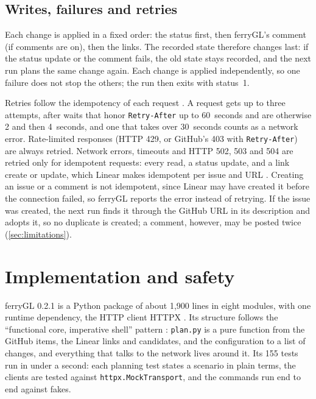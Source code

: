 \documentclass[11pt,a4paper]{article}
\newcommand{\ferry}{ferryGL}
\newcommand{\code}[1]{\texttt{#1}}
\newcommand{\version}{0.2.1}
\begin{document}
\subsection{Writes, failures and retries}
\label{sec:failures}

Each change is applied in a fixed order: the status first, then \ferry's comment (if comments
are on), then the links. The recorded state therefore changes last: if the status update or the
comment fails, the old state stays recorded, and the next run plans the same change again. Each
change is applied independently, so one failure does not stop the others; the run then exits
with status~1.

Retries follow the idempotency of each request \cite{helland2012idempotence,
fielding2022rfc9110}. A request gets up to three attempts, after waits that honor
\code{Retry-After} up to 60~seconds and are otherwise 2 and then 4~seconds, and one that takes
over 30~seconds counts as a network error. Rate-limited responses (HTTP 429, or GitHub's 403
with \code{Retry-After}) are always retried. Network errors, timeouts and HTTP 502, 503 and 504
are retried only for idempotent requests: every read, a status update, and a link create or
update, which Linear makes idempotent per issue and URL \cite{linear2026attachments}. Creating
an issue or a comment is not idempotent, since Linear may have created it before the connection
failed, so \ferry{} reports the error instead of retrying. If the issue was created, the next
run finds it through the GitHub URL in its description and adopts it, so no duplicate is
created; a comment, however, may be posted twice (\cref{sec:limitations}).

\section{Implementation and safety}
\label{sec:implementation}

\ferry{} \version{} is a Python package of about 1,900 lines in eight modules, with one runtime
dependency, the HTTP client HTTPX \cite{encode2024httpx}. Its structure follows the
\enquote{functional core, imperative shell} pattern \cite{bernhardt2012functional,
moseley2006tar}: \code{plan.py} is a pure function from the GitHub items, the Linear links and
candidates, and the configuration to a list of changes, and everything that talks to the network
lives around it. Its 155 tests run in under a second: each planning test states a scenario in
plain terms, the clients are tested against \code{httpx.MockTransport}, and the commands run end
to end against fakes.
\end{document}
